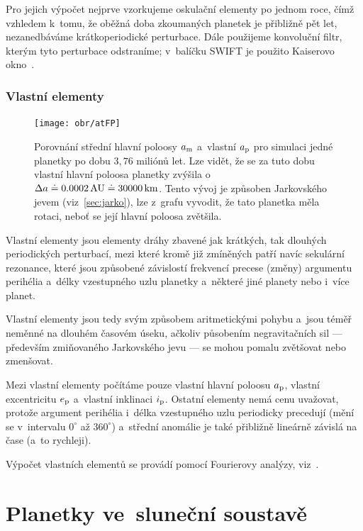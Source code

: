 \documentclass[A4paper, 12pt, oneside, openany]{book}
\begin{document}
Pro jejich výpočet nejprve vzorkujeme oskulační elementy po jednom roce, čímž vzhledem k~tomu, že oběžná doba zkoumaných planetek je přibližně pět let, nezanedbáváme krátkoperiodické perturbace. Dále použijeme konvoluční filtr, kterým tyto perturbace odstraníme; v~balíčku SWIFT je použito Kaiserovo okno~\cite{quinn91}.

\subsection{Vlastní elementy}

\begin{figure}
	\centering
	\texttt{[image: obr/atFP]}
	\caption{Porovnání střední hlavní poloosy $a_{\rm m}$ a~vlastní $a_{\rm p}$ pro simulaci jedné planetky po dobu $3,76$ miliónů let. Lze vidět, že se za tuto dobu vlastní hlavní poloosa planetky zvýšila o~$\Delta a\doteq0.0002\,{\rm AU}\doteq30000\, {\rm km}$. Tento vývoj je způsoben Jarkovského jevem (viz~\ref{sec:jarko}), lze z~grafu vyvodit, že tato planetka měla  rotaci, neboť se její hlavní poloosa zvětšila.}
	\label{atFP}
\end{figure}

Vlastní elementy jsou elementy dráhy zbavené jak krátkých, tak dlouhých periodických perturbací, mezi které kromě již zmíněných patří navíc sekulární rezonance, které jsou způsobené závislostí frekvencí precese (změny) argumentu perihélia a~délky vzestupného uzlu planetky a~některé jiné planety nebo i~více planet.

Vlastní elementy jsou tedy svým způsobem aritmetickými  pohybu a~jsou téměř neměnné na dlouhém časovém úseku, ačkoliv působením negravitačních sil --- především zmiňovaného Jarkovského jevu --- se mohou pomalu zvětšovat nebo zmenšovat. 

Mezi vlastní elementy počítáme pouze vlastní hlavní poloosu $a_{\rm p}$, vlastní excentricitu $e_{\rm p}$ a~vlastní inklinaci $i_{\rm p}$. Ostatní elementy nemá cenu uvažovat, protože argument perihélia i~délka vzestupného uzlu periodicky precedují (mění se v~intervalu $0^\circ$ až $360^\circ$) a~střední anomálie je také přibližně lineárně závislá na čase (a~to rychleji).

Výpočet vlastních elementů se provádí pomocí Fourierovy analýzy, viz~\cite{sidlichovsky96}. 

\chapter{Planetky ve~sluneční soustavě} \label{ch:planetky}
\end{document}
